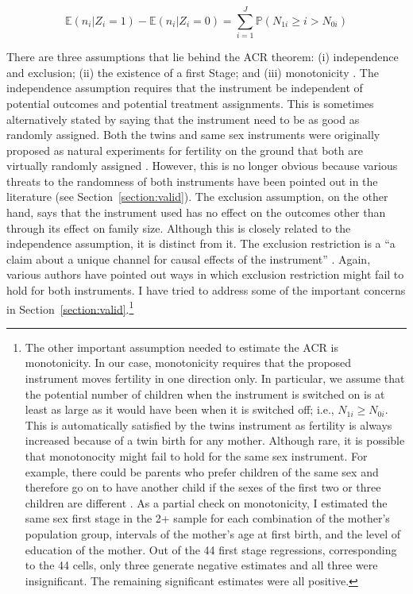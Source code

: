 \begin{equation}\label{eq:04}
\mathbb{E}(n_{i} | Z_{i} = 1) - \mathbb{E}(n_{i} | Z_{i} = 0) = \sum_{i = 1}^{J} \mathbb{P}(N_{1i} \geq i > N_{0i})
\end{equation}

There are three assumptions that lie behind the ACR theorem: (i) independence and exclusion; (ii) the existence of a first Stage; and (iii) monotonicity \parencite{Angrist2009}. The independence assumption requires that the instrument be independent of potential outcomes and potential treatment assignments. This is sometimes alternatively stated by saying that the instrument need to be as good as randomly assigned. Both the twins and same sex instruments were originally proposed as natural experiments for fertility on the ground that both are virtually randomly assigned \parencite{rosenzweig_testing_1980,angrist_children_1998}. However, this is no longer obvious because various threats to the randomness of both instruments have been pointed out in the literature (see Section~\ref{section:valid}). The exclusion assumption, on the other hand, says that the instrument used has no effect on the outcomes other than through its effect on family size.  Although this is closely related to the independence assumption, it is distinct from it. The exclusion restriction is a \enquote{a claim about a unique channel for causal effects of the instrument} \parencite[p.~153]{Angrist2009}. Again, various authors have pointed out ways in which exclusion restriction might fail to hold for both instruments. I have tried to address some of the important concerns in Section~\ref{section:valid}.\footnote{ The other important assumption needed to estimate the ACR is monotonicity. In our case, monotonicity requires that the proposed instrument moves fertility in one direction only. In particular, we assume that the potential number of children when the instrument is switched on is at least as large as it would have been when it is switched off; i.e., $ N_{1i} \geq N_{0i} $. This is automatically satisfied by the twins instrument as fertility is always increased because of a twin birth for any mother. Although rare, it is possible that monotonocity might fail to hold for the same sex instrument. For example, there could be parents who prefer children of the same sex and therefore go on to have another child if the sexes of the first two or three children are different \parencite{Huber2015}. As a partial check on monotonicity, I estimated the same sex first stage in the 2+ sample for each combination of the mother's population group, intervals of the mother's age at first birth, and the level of education of the mother. Out of the 44 first stage regressions, corresponding to the 44 cells, only three generate negative estimates and all three were insignificant. The remaining significant estimates were all positive.} 

